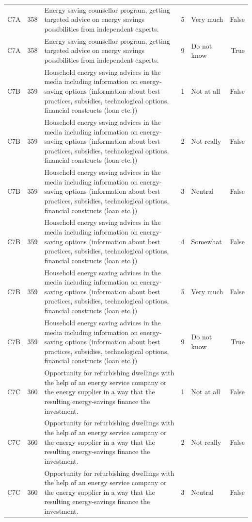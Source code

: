 \begin{tabular}{lrlllr}
C7A & 358 & Energy saving counsellor program, getting targeted advice on energy savings possibilities from independent experts. & 5 & Very much & False \\
C7A & 358 & Energy saving counsellor program, getting targeted advice on energy savings possibilities from independent experts. & 9 & Do not know & True \\
C7B & 359 & Household energy saving advices in the media including information on energy-saving options (information about best practices, subsidies, technological options, financial constructs (loan etc.)) & 1 & Not at all & False \\
C7B & 359 & Household energy saving advices in the media including information on energy-saving options (information about best practices, subsidies, technological options, financial constructs (loan etc.)) & 2 & Not really & False \\
C7B & 359 & Household energy saving advices in the media including information on energy-saving options (information about best practices, subsidies, technological options, financial constructs (loan etc.)) & 3 & Neutral & False \\
C7B & 359 & Household energy saving advices in the media including information on energy-saving options (information about best practices, subsidies, technological options, financial constructs (loan etc.)) & 4 & Somewhat & False \\
C7B & 359 & Household energy saving advices in the media including information on energy-saving options (information about best practices, subsidies, technological options, financial constructs (loan etc.)) & 5 & Very much & False \\
C7B & 359 & Household energy saving advices in the media including information on energy-saving options (information about best practices, subsidies, technological options, financial constructs (loan etc.)) & 9 & Do not know & True \\
C7C & 360 & Opportunity for refurbishing dwellings with the help of an energy service company or the energy supplier in a way that the resulting energy-savings finance the investment. & 1 & Not at all & False \\
C7C & 360 & Opportunity for refurbishing dwellings with the help of an energy service company or the energy supplier in a way that the resulting energy-savings finance the investment. & 2 & Not really & False \\
C7C & 360 & Opportunity for refurbishing dwellings with the help of an energy service company or the energy supplier in a way that the resulting energy-savings finance the investment. & 3 & Neutral & False \\

\end{tabular}
